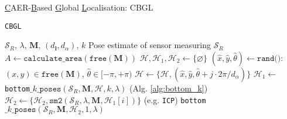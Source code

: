 \begin{frame}{\underline{C}AER-\underline{B}ased \underline{G}lobal \underline{L}ocalisation: CBGL}









  \begin{minipage}{0.46\textwidth}
    \centering
    \begin{algorithm}[H]\scriptsize
      \caption{\texttt{CBGL}}
      \begin{spacing}{1.2}
        \begin{algorithmic}[1]
          \REQUIRE $\mathcal{S}_R$, $\lambda$, $\bm{M}$, $(d_{\bm{l}}, d_\alpha)$, $k$
          \ENSURE Pose estimate of sensor measuring $\mathcal{S}_R$ %
          \STATE {} $A \leftarrow \texttt{calculate\_area}(\texttt{free}(\bm{M}))$
          \STATE $\mathcal{H}, \mathcal{H}_1, \mathcal{H}_2 \leftarrow \{\varnothing\}$
          \STATE $(\hat{x},\hat{y},\hat{\theta}) \leftarrow \texttt{rand()}$: $(x,y) \in \texttt{free}(\bm{M})$, $\hat{\theta} \in [-\pi,+\pi)$
          \STATE $\mathcal{H} \leftarrow \{\mathcal{H}, (\hat{x}, \hat{y}, \hat{\theta} + j \cdot 2\pi / d_{\alpha})\}$     \label{alg:cbgl:h}
          \ENDFOR
          \ENDFOR {}
          \STATE $\mathcal{H}_1 \leftarrow$ \texttt{bottom}$\_k\_\texttt{poses}(\mathcal{S}_R, \bm{M}, \mathcal{H}, k, \lambda)$ \hfill {(Alg. \ref{alg:bottom_k}})
          \STATE $\mathcal{H}_2 \leftarrow \{\mathcal{H}_2, \texttt{sm2}(\mathcal{S}_R, \lambda, \bm{M}, \mathcal{H}_1[i])\}$ \hfill {(e.g. \texttt{ICP}})
          \ENDFOR {}
          \RETURN \texttt{bottom}$\_k\_\texttt{poses}(\mathcal{S}_R, \bm{M}, \mathcal{H}_2, 1, \lambda)$
        \end{algorithmic}
      \end{spacing}
      \label{alg:cbgl}
    \end{algorithm}
  \end{minipage}
  \hfill
  \begin{minipage}{0.46\textwidth}
    \centering
      \begin{algorithm}[H]\scriptsize

\end{algorithm}
\end{minipage}
\end{frame}

